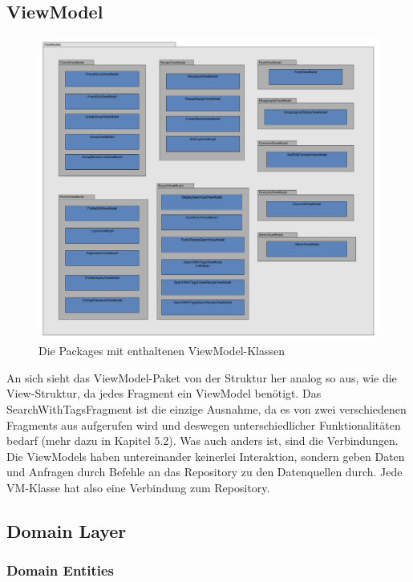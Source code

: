 \subsection{ViewModel}

\begin{figure}[H]
	\centering
	\includegraphics[width=\textwidth]{pics/viewModel/ViewModelPackages.pdf}%
	\caption{Die Packages mit enthaltenen ViewModel-Klassen}%
	\label{vmpackages}%
\end{figure}

An sich sieht das ViewModel-Paket von der Struktur her analog so aus, wie die View-Struktur, da jedes Fragment ein ViewModel benötigt. Das SearchWithTagsFragment ist die einzige Ausnahme, da es von zwei verschiedenen Fragments aus aufgerufen wird und deswegen unterschiedlicher Funktionalitäten bedarf (mehr dazu in Kapitel 5.2). Was auch anders ist, sind die Verbindungen. Die ViewModels haben untereinander keinerlei Interaktion, sondern geben Daten und Anfragen durch Befehle an das Repository zu den Datenquellen durch. Jede VM-Klasse hat also eine Verbindung zum Repository.

\subsection{Domain Layer}

\subsubsection{Domain Entities}

